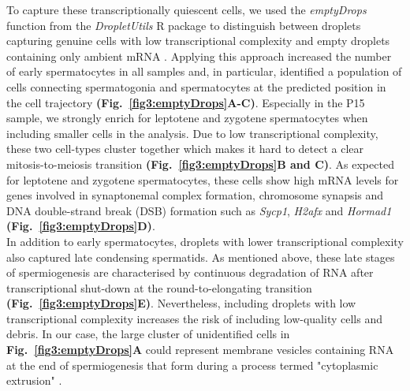 To capture these transcriptionally quiescent cells, we used the \emph{emptyDrops} function from the \emph{DropletUtils} R package to distinguish between droplets capturing genuine cells with low transcriptional complexity and empty droplets containing only ambient mRNA \citep{Lun2018}. Applying this approach increased the number of early spermatocytes in all samples and, in particular, identified a population of cells connecting spermatogonia and spermatocytes at the predicted position in the cell trajectory \textbf{(Fig.~\ref{fig3:emptyDrops}A-C)}. Especially in the P15 sample, we strongly enrich for leptotene and zygotene spermatocytes when including smaller cells in the analysis. Due to low transcriptional complexity, these two cell-types cluster together which makes it hard to detect a clear mitosis-to-meiosis transition \textbf{(Fig.~\ref{fig3:emptyDrops}B and C)}. As expected for leptotene and zygotene spermatocytes, these cells show high mRNA levels for genes involved in synaptonemal complex formation, chromosome synapsis and DNA double-strand break (DSB) formation such as \textit{Sycp1}, \textit{H2afx} and \textit{Hormad1} \citep{Daniel2011, Mahadevaiah2001, Vries2005} \textbf{(Fig.~\ref{fig3:emptyDrops}D)}.\\

In addition to early spermatocytes, droplets with lower transcriptional complexity also captured late condensing spermatids. As mentioned above, these late stages of spermiogenesis are characterised by continuous degradation of RNA after transcriptional shut-down at the round-to-elongating transition \citep{Steger1999} \textbf{(Fig.~\ref{fig3:emptyDrops}E)}. Nevertheless, including droplets with low transcriptional complexity increases the risk of including low-quality cells and debris. In our case, the large cluster of unidentified cells in \textbf{Fig.~\ref{fig3:emptyDrops}A} could represent membrane vesicles containing RNA at the end of spermiogenesis that form during a process termed "cytoplasmic extrusion" \citep{Rengan2012}.\\

\newpage

